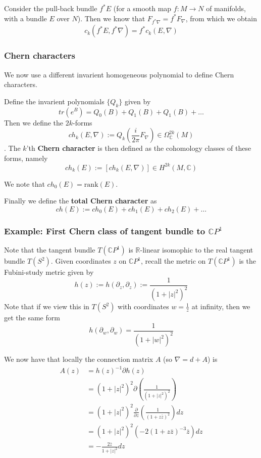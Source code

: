 \documentclass[a4paper]{article}
\theoremstyle{definition} \newtheorem*{definition}{Definition}
\theoremstyle{definition} \newtheorem*{definitions}{Definitions}
\theoremstyle{plain} \newtheorem{theorem}{Theorem}[section]
\theoremstyle{plain} \newtheorem{proposition}[theorem]{Proposition}
\theoremstyle{plain} \newtheorem{corollary}[theorem]{Corollary}
\theoremstyle{plain} \newtheorem{lemma}[theorem]{Lemma}
\theoremstyle{plain} \newtheorem{example}[theorem]{Example}
\newcommand{\defn}[1]{\textbf{#1}}
\newcommand{\realnos}{\mathbb{R}}
\newcommand{\complexnos}{\mathbb{C}}
\begin{document}
Consider the pull-back bundle $f^*E$ (for a smooth map $f:M\to N$ of manifolds, with a bundle $E$ over $N$). Then we know that $F_{f^*\nabla}=f^* F_\nabla$, from which we obtain
$$c_k(f^*E, f^*\nabla)= f^* c_k(E, \nabla)$$

\subsubsection{Chern characters}
We now use a different invarient homogeneous polynomial to define Chern characters. 

Define the invarient polynomials $\{Q_k\}$ given by 
$$tr(e^B)=Q_0(B)+Q_1(B)+Q_1(B)+\ldots $$
Then we define the $2k$-forms 
$$ch_k(E,\nabla):=Q_k \left( \frac{i}{2\pi}F_\nabla \right) \in \Omega^{2k}_\complexnos (M)$$.
The $k$'th \defn{Chern character} is then defined as the cohomology classes of these forms, namely
$$ch_k(E):= [ch_k(E, \nabla)]\in H^{2k}(M, \complexnos)$$

We note that $ch_0(E)=\text{rank}(E)$.

Finally we define the \defn{total Chern character} as 
$$ch(E):=ch_0(E)+ch_1(E)+ch_2(E)+\ldots$$

\subsubsection{Example: First Chern class of tangent bundle to $\complexnos P^1$}
Note that the tangent bundle $T(\complexnos P^1)$ is $\realnos$-linear isomophic to the real tangent bundle $T(S^2)$. Given coordinates $z$ on $\complexnos P^1$, recall the metric on $T(\complexnos P^1)$ is the Fubini-study metric given by
$$h(z):= h(\partial_z, \partial_z) := \frac{1}{(1+|z|^2)^2}$$
Note that if we view this in $T(S^2)$ with coordinates $w=\frac{1}{z}$ at infinity, then we get the same form 
$$h(\partial_w, \partial_w)=\frac{1}{(1+|w|^2)^2}$$

We now have that locally the connection matrix $A$ (so $\nabla=d+A$) is 
\begin{align*}
A(z) & =h(z)^{-1}\partial h(z) \\
& = (1+|z|^2)^2 \partial \left( \frac{1}{(1+|z|^2)^2} \right) \\
& = (1+|z|^2)^2 \frac{\partial}{\partial z} \left( \frac{1}{(1+z\bar{z})^2} \right)dz \\
& = (1+|z|^2)^2 \left( -2 (1+z\bar{z})^{-3} \bar{z} \right)dz \\
& = -\frac{2\bar{z}}{1+|z|^2} dz
\end{align*}
\end{document}
